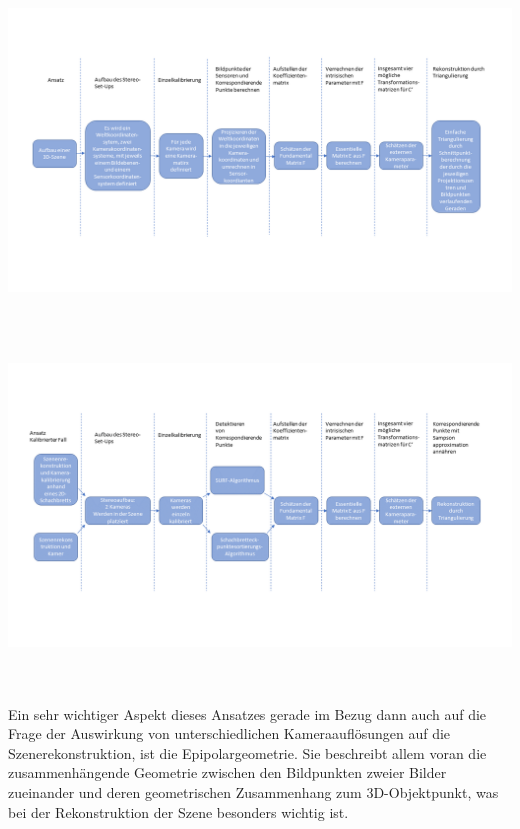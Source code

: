 \begin{minipage}{\linewidth}
	\centering
	\includegraphics[width=1.\linewidth]{images/ArbeitsProzessMinimal.png}
	\label{fig:ArbeitsProzessMinimal}
\end{minipage}\\ \\


\begin{minipage}{\linewidth}
	\centering
	\includegraphics[width=1.\linewidth]{images/ArbeitsProzessReal.png}
	\label{fig:ArbeitsProzessReal}
\end{minipage}\\ \\


Ein sehr wichtiger Aspekt dieses Ansatzes gerade im Bezug dann auch auf die Frage der Auswirkung von unterschiedlichen Kameraauflösungen auf die Szenerekonstruktion, ist die Epipolargeometrie. Sie beschreibt allem voran die zusammenhängende Geometrie zwischen den Bildpunkten zweier Bilder zueinander und deren geometrischen Zusammenhang zum 3D-Objektpunkt, was bei der Rekonstruktion der Szene besonders wichtig ist.\\


